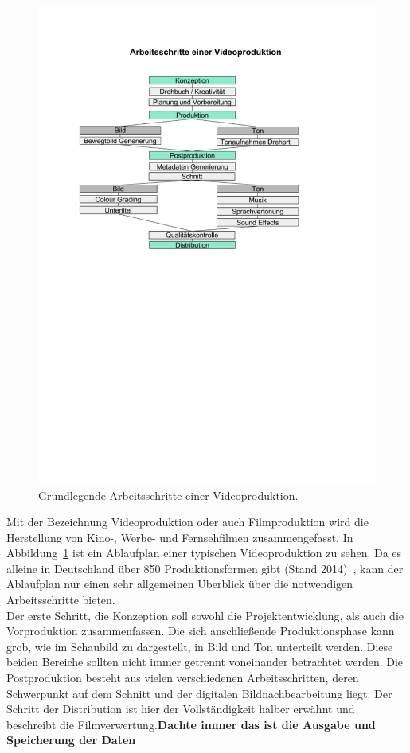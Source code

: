 \documentclass[times, 11pt,twocolumn]{article}
\begin{document}
 \label{sec:Videoproduktion}
\begin{figure}
	\flushleft
	\includegraphics[width=\columnwidth, trim = 20mm 145mm 45mm 40mm, clip]{Bilder/ArbeitsschritteVideoproduktion.pdf}
	\caption{Grundlegende Arbeitsschritte einer Videoproduktion.}
	\label{fig:Videoproduktion}
\end{figure}
Mit der Bezeichnung Videoproduktion oder auch Filmproduktion wird die Herstellung von Kino-, Werbe- und Fernsehfilmen zusammengefasst. In Abbildung~\ref{fig:Videoproduktion} ist ein Ablaufplan einer typischen Videoproduktion zu sehen. Da es alleine in Deutschland über 850 Produktionsformen gibt (Stand 2014)~\cite{formatt}, kann der Ablaufplan nur einen sehr allgemeinen Überblick über die notwendigen Arbeitsschritte bieten. \\
Der erste Schritt, die Konzeption soll sowohl die Projektentwicklung, als auch die Vorproduktion zusammenfassen. Die sich anschließende Produktionsphase kann grob, wie im Schaubild zu dargestellt, in Bild und Ton unterteilt werden. Diese beiden Bereiche sollten nicht immer getrennt voneinander betrachtet werden. Die Postproduktion besteht aus vielen verschiedenen Arbeitsschritten, deren Schwerpunkt auf dem Schnitt und der digitalen Bildnachbearbeitung liegt. Der Schritt der Distribution ist hier der Vollständigkeit halber erwähnt und beschreibt die Filmverwertung.\textbf{Dachte immer das ist die Ausgabe und Speicherung der Daten} \\
\end{document}

